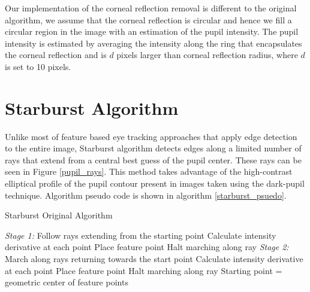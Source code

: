 \documentclass[12pt,fleqn]{book} %
\begin{document}
Our implementation of the corneal reflection removal is different to the original algorithm, we assume that the corneal reflection is circular and hence we fill a circular region in the image with an estimation of the pupil intensity. The pupil intensity is estimated by averaging the intensity along the ring that encapsulates the corneal reflection and is $d$ pixels larger than corneal reflection radius, where $d$ is set to 10 pixels.



\section{Starburst Algorithm}

Unlike most of feature based eye tracking approaches that apply edge detection to the entire image, Starburst algorithm detects edges along a limited number of rays that extend from a central best guess of the pupil center. These rays can be seen in Figure \ref{pupil_rays}. This method takes advantage of the high-contrast elliptical profile of the pupil contour present in images taken using the dark-pupil technique. Algorithm pseudo code is shown in algorithm \ref{starburst_psuedo}. \bigskip


\begin{algorithm}
\begin{dBox}
	\caption{Starburst Original Algorithm} \label{starburst_psuedo}
	\begin{algorithmic}[1]
			\Repeat  
				\vspace{1em}	
				\State \emph{Stage 1:}
					\State Follow rays extending from the starting point
					\State Calculate intensity derivative at each point
						\State Place feature point
						\State Halt marching along ray
					\EndIf		
				\vspace{1em}	
				\State \emph{Stage 2:}
						\State March along rays returning towards the start point
						\State Calculate intensity derivative at each point
							\State Place feature point
							\State Halt marching along ray
						\EndIf		
					\EndFor
					\vspace{.3em}			
					\State Starting point = geometric center of feature points
			\vspace{1em}							
		\EndProcedure	
	\end{algorithmic}
\end{dBox}	
\end{algorithm}
\end{document}
